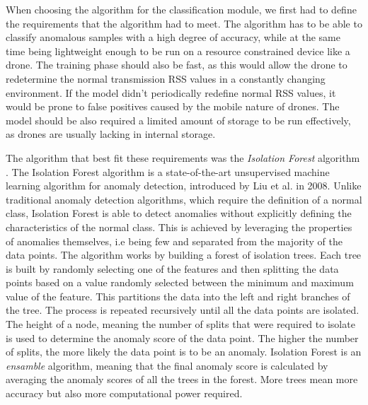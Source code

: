 \documentclass[futureinternet,article,submit,pdftex,moreauthors]{Definitions/mdpi}
\begin{document}
When choosing the algorithm for the classification module, we first had to define the requirements that the algorithm had to meet. The algorithm has to be able to classify anomalous samples with a high degree of accuracy, while at the same time 
being lightweight enough to be run on a resource constrained device like a drone. The training phase should also be fast, as this would allow the drone to redetermine the normal transmission RSS values in a constantly changing environment. If the model didn't periodically redefine normal RSS values, 
it would be prone to false positives caused by the mobile nature of drones. 
The model should be also required a limited amount of storage to be run effectively, as drones are usually lacking in internal storage. 

The algorithm that best fit these requirements was the \textit{Isolation Forest} algorithm \cite{IsolationForestLiu}. The Isolation Forest algorithm is a state-of-the-art unsupervised machine learning algorithm for anomaly detection, introduced by Liu et al. in 2008. 
Unlike traditional anomaly detection algorithms, which require the definition of a normal class, Isolation Forest is able to detect anomalies without explicitly defining the characteristics of the normal class.
This is achieved by leveraging the properties of anomalies themselves, i.e being few and separated from the majority of the data points. 
The algorithm works by building a forest of isolation trees. Each tree is built by randomly selecting one of the features and then splitting the data points based on a value randomly selected between the minimum and maximum value of the feature. This partitions the data into the 
left and right branches of the tree. The process is repeated recursively until all the data points are isolated. The height of a node, meaning the number of splits that were required to isolate is used to determine the anomaly score of the data point. The higher the number of splits, the more likely the data point is to be an anomaly.
Isolation Forest is an \textit{ensamble} algorithm, meaning that the final anomaly score is calculated by averaging the anomaly scores of all the trees in the forest. More trees mean more accuracy but also more computational power required.
\end{document}
